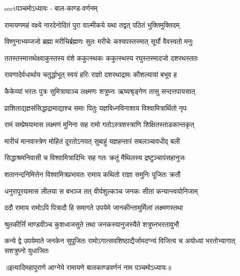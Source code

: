 
\vakta{}
\shrota{}
\notes{}
\translink{}

\storymeta

sect{पञ्चमोऽध्यायः - बाल-काण्ड-वर्णनम्}

\twolineshloka
{रामायणमहं वक्ष्ये नारदेनोदितं पुरा}
{वाल्मीकये यथा तद्वत् पठितं भुक्तिमुक्तिदम्} %

\twolineshloka
{विष्णुनाभ्यव्जजो ब्रह्मा मरीचिर्ब्रह्मणः सुतः}
{मरीचेः कश्यपस्तस्मात् सूर्यो वैवस्वतो मनुः} %

\twolineshloka
{ततस्तस्मात्तथेक्ष्वाकुस्तस्य वंशे ककुत्स्थकः}
{ककुत्स्थस्य रघुस्तस्मादजो दशरथस्ततः} %

\twolineshloka
{रावणादेर्वधार्थाय चतुर्द्धाभूत् स्वयं हरिः}
{राज्ञो दशरथाद्रामः कौशल्यायां बभूव ह} %

\twolineshloka
{कैकेय्यां भरतः पुत्रः सुमित्रायाञ्च लक्ष्मणः}
{शत्रुघ्नः ऋष्यश्रृङ्गेण तासु सन्दत्तपायसात्} %

\twolineshloka
{प्राशिताद्यज्ञसंसिद्धाद्रामाद्याश्च समाः पितुः}
{यज्ञविध्नविनाशाय विश्वामित्रार्थितो नृपः} %

\twolineshloka
{रामं सम्प्रेषयामास लक्ष्मणं मुनिना सह}
{रामो गतोऽस्त्रशस्त्राणि शिक्षितस्ताडकान्तकृत्} %

\twolineshloka
{मारीचं मानवास्त्रेण मोहितं दूरतोऽनयत्}
{सुबाहुं यज्ञहन्तारं सबलञ्चावधीद् बली} %

\twolineshloka
{सिद्धाश्रमनिवासी च विश्वामित्रादिभिः सह}
{गतः क्रतुं मैथिलस्य द्रष्टुञ्चापंसहानुजः} %

\twolineshloka
{शतानन्दनिमित्तेन विश्वामित्रप्रभावतः}
{रामाय कथितो राज्ञा समुनिः पूजितः क्रतौ} %

\twolineshloka
{धनुरापूरयामास लीलया स बभञ्ज तत् }
{वीर्यशुल्कञ्च जनकः सीतां कन्यान्त्वयोनिजाम्} %

\twolineshloka
{ददौ रामाय रामोऽपि पित्रादौ हि समागते}
{उपयेमे जानकीन्तामुर्मिलां लक्ष्मणस्तथा} %

\twolineshloka
{श्रुतकीर्त्तिं माण्डवीञ्च कुशध्वजसुते तथा}
{जनकस्यानुजस्यैते शत्रुघ्नभरतावुभौ} %

\threelineshloka
{कन्ये द्वे उपयेमाते जनकेन सुपूजितः}
{रामोऽगात्सवशिष्ठाद्यैर्जामदग्न्यं विजित्य च}
{अयोध्यां भरतोभ्यागात् सशत्रुघ्नो युधाजितः} %

॥इत्यादिमहापुराणे आग्नेये रामायणे बालकाण्डवर्णनं नाम पञ्चमोऽध्यायः॥


